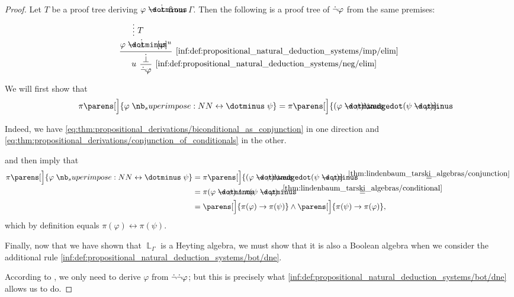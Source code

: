 \begin{proof}
   Let \( T \) be a proof tree deriving \( \varphi \synimplies \synbot \) from \( \Gamma \). Then the following is a proof tree of \( \dot{\neg} \varphi \) from the same premises:
  \begin{equation*}
    \begin{prooftree}
      \hypo{}
      \ellipsis {\( T \)} { \varphi \synimplies \synbot }
      \hypo{ [\varphi]^u }
      \infer2[\ref{inf:def:propositional_natural_deduction_systems/imp/elim}]{ \synbot }

      \infer[left label=\( u \)]1[\ref{inf:def:propositional_natural_deduction_systems/neg/elim}]{ \synneg \varphi }
    \end{prooftree}
  \end{equation*}

   We will first show that
  \begin{equation*}
    \pi\parens[\Big]{ \varphi \syniff \psi } = \pi\parens[\Big]{ (\varphi \synimplies \psi) \synwedge (\psi \synimplies \varphi) }.
  \end{equation*}

  Indeed, we have \eqref{eq:thm:propositional_derivations/biconditional_as_conjunction} in one direction and \eqref{eq:thm:propositional_derivations/conjunction_of_conditionals} in the other.

   and  then imply that
  \begin{align*}
    \pi\parens[\Big]{ \varphi \syniff \psi }
    &=
    \pi\parens[\Big]{ (\varphi \synimplies \psi) \synwedge (\psi \synimplies \varphi) }
    \reloset {\ref{thm:lindenbaum_tarski_algebras/conjunction}} = \\ &=
    \pi(\varphi \synimplies \psi) \wedge \pi(\psi \synimplies \varphi)
    \reloset {\ref{thm:lindenbaum_tarski_algebras/conditional}} = \\ &=
    \parens[\Big]{ \pi(\varphi) \rightarrow \pi(\psi) } \wedge \parens[\Big]{ \pi(\psi) \rightarrow \pi(\varphi) },
  \end{align*}
  which by definition equals \( \pi(\varphi) \leftrightarrow \pi(\psi) \).

   Finally, now that we have shown that \( \BbbL_\Gamma \) is a Heyting algebra, we must show that it is also a Boolean algebra when we consider the additional rule \ref{inf:def:propositional_natural_deduction_systems/bot/dne}.

  According to , we only need to derive \( \varphi \) from \( \dot{\neg} \dot{\neg} \varphi \); but this is precisely what \ref{inf:def:propositional_natural_deduction_systems/bot/dne} allows us to do.
\end{proof}

